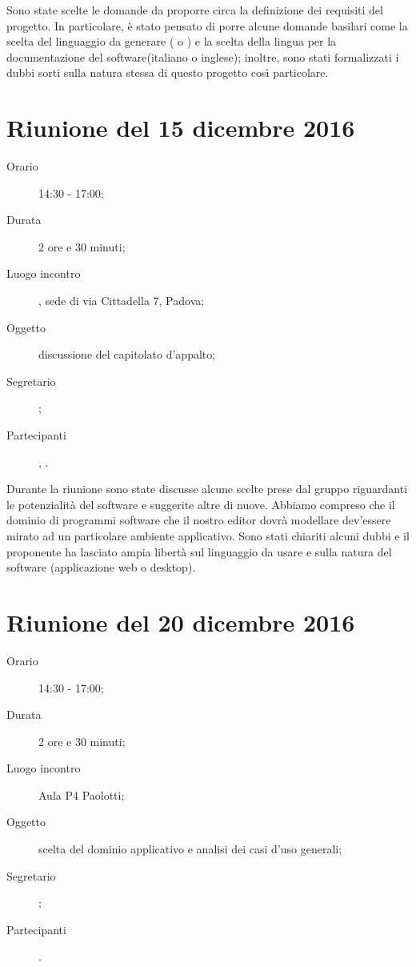 Sono state scelte le domande da proporre circa la definizione dei requisiti del progetto. In particolare, è stato pensato di porre alcune domande basilari come la scelta del linguaggio da generare ( o ) e la scelta della lingua per la documentazione del software(italiano o inglese); inoltre, sono stati formalizzati i dubbi sorti sulla natura stessa di questo progetto così particolare.



\section{Riunione del 15 dicembre 2016}

\begin{description}
	\item[Orario] 14:30 - 17:00;
	\item[Durata] 2 ore e 30 minuti;
	\item[Luogo incontro] \ZU, sede di via Cittadella 7, Padova;
	\item[Oggetto] discussione del capitolato d'appalto;
	\item[Segretario] \LS; 
	\item[Partecipanti] \GP, \ALL.
\end{description}

Durante la riunione sono state discusse alcune scelte prese dal gruppo riguardanti le potenzialità del software e suggerite altre di nuove. Abbiamo compreso che il dominio di programmi software che il nostro editor dovrà modellare dev'essere mirato ad un particolare ambiente applicativo. Sono stati chiariti alcuni dubbi e il proponente ha lasciato ampia libertà sul linguaggio da usare e sulla natura del software (applicazione web o desktop).



\section{Riunione del 20 dicembre 2016}

\begin{description}
	\item[Orario] 14:30 - 17:00;
	\item[Durata] 2 ore e 30 minuti;
	\item[Luogo incontro] Aula P4 Paolotti;
	\item[Oggetto] scelta del dominio applicativo e analisi dei casi d'uso generali;
	\item[Segretario] \PB; 
	\item[Partecipanti] \ALL.
\end{description}

